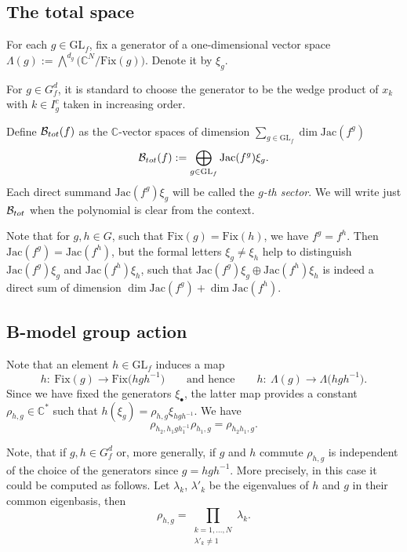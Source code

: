 \documentclass[10pt,a4paper]{article}
\numberwithin{equation}{section}
\newcommand{\CC}{{\mathbb{C}}}
\newcommand{\GL}{{\mathrm{GL}}}
\newcommand{\Jac}{\mathrm{Jac}}
\newcommand{\Fix}{\mathrm{Fix}}
\def\B{{\mathcal B}}
\begin{document}
\subsection{The total space}
For each $g\in \GL_f$, fix a generator of a one-dimensional vector space $\Lambda(g):=\bigwedge^{d_g}\bigl(\CC^N/\Fix(g)\bigr)$. Denote it by $\xi_g$.

For $g\in G_f^d$, it is standard to choose the generator to be the wedge product of $x_k$ with $k\in I^c_g$ taken in increasing order.

Define $\B_{\rm tot}(f)$ as the $\CC$-vector spaces of dimension $\sum_{g \in \GL_f} \dim \Jac(f^g)$
\begin{equation}\label{eq: Btot in jac sectors}
	\B_{\rm tot}(f) := \bigoplus_{g \in \GL_f} \Jac(f^g) \xi_g.
\end{equation}
Each direct summand $\Jac(f^g) \xi_g$ will be called the \textit{$g$-th sector}.
We will write just $\B_{\rm tot}$ when the polynomial is clear from the context.

\begin{Remark}
Note that for $g,h \in G$, such that $\Fix(g) = \Fix(h)$, we have $f^g = f^h$. Then $\Jac(f^g) = \Jac(f^h)$, but the formal letters $\xi_g \neq \xi_h$ help to distinguish $\Jac(f^g) \xi_g$ and $\Jac(f^h)\xi_h$, such that $\Jac(f^g) \xi_g \oplus \Jac(f^h)\xi_h$ is indeed a direct sum of dimension $\dim\Jac(f^g)+\dim\Jac(f^h)$.
\end{Remark}

\subsection{B-model group action}

Note that an element $h\in\GL_f$ induces a map
\[h\colon \ \Fix(g)\to \Fix\bigl(hgh^{-1}\bigr)\qquad \text{and hence}\qquad h\colon\ \Lambda(g)\to \Lambda\bigl(hgh^{-1}\bigr).\] Since we have fixed the generators $\xi_\bullet$, the latter map provides a constant $\rho_{h,g}\in\CC^*$ such that $h ( \xi_{g} ) = \rho_{h,g} \xi_{hgh^{-1}}$. We have
\begin{equation}\label{eq: rho relation}
 \rho_{h_2,h_1gh_1^{-1}}\rho_{h_1,g}=\rho_{h_2h_1,g}.
\end{equation}

Note, that if $g,h\in G_f^d$ or, more generally, if $g$ and $h$ commute $\rho_{h,g}$ is independent of the choice of the generators since $g=hgh^{-1}$. More precisely, in this case it could be computed as follows. Let $\lambda_k$, $\lambda'_k$ be the eigenvalues of $h$ and $g$ in their common eigenbasis, then
\begin{equation*}%
 \rho_{h,g}=\prod_{\substack{ k=1,\dots,N \\ \lambda'_k \neq 1}} \lambda_k.
\end{equation*}
\end{document}
